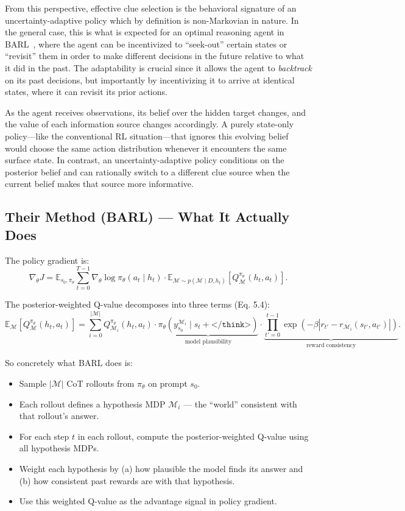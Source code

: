 \documentclass[11pt]{article}
\theoremstyle{plain}
\theoremstyle{definition}
\theoremstyle{remark}
\begin{document}
From this perspective, effective clue selection is the behavioral signature of
an uncertainty-adaptive policy which by definition is non-Markovian in nature. In the general case, this is what is expected for an optimal reasoning agent in BARL~\citep{zhang2025markovianreflectiveexplorationbayesadaptive}, where the agent can be incentivized to “seek-out” certain states or “revisit” them in order to make different decisions in the future relative to what it did in the past. The adaptability is crucial since it allows the agent to \textit{backtrack} on its past decisions, but importantly by incentivizing it to arrive at identical states, where it can revisit its prior actions. 


As the agent receives observations, its belief
over the hidden target changes, and the value of each information source changes
accordingly. A purely state-only policy—like the conventional RL situation—that ignores this evolving belief would
choose the same action distribution whenever it encounters the same surface
state. In contrast, an uncertainty-adaptive policy conditions on the posterior
belief and can rationally switch to a different clue source when the current
belief makes that source more informative.



\subsection{Their Method (BARL) --- What It Actually Does}

The policy gradient is:
\[
\nabla_\theta J
=
\mathbb{E}_{s_0,\pi_\theta}
\sum_{t=0}^{T-1}
\nabla_\theta \log \pi_\theta(a_t \mid h_t)
\cdot
\mathbb{E}_{\mathcal{M}\sim p(\mathcal{M}\mid D,h_t)}
\left[
Q^{\pi_\theta}_{\mathcal{M}}(h_t,a_t)
\right].
\]

The posterior-weighted Q-value decomposes into three terms (Eq. 5.4):
\[
\mathbb{E}_{\mathcal{M}}
\left[
Q^{\pi_\theta}_{\mathcal{M}}(h_t,a_t)
\right]
=
\sum_{i=0}^{|\mathcal{M}|}
Q^{\pi_\theta}_{\mathcal{M}_i}(h_t,a_t)
\cdot
\underbrace{
\pi_\theta
\left(
y^{\mathcal{M}_i}_{s_0}
\mid
s_t + \texttt{</think>}
\right)
}_{\text{model plausibility}}
\cdot
\underbrace{
\prod_{t'=0}^{t-1}
\exp\left(
-\beta
\left|
r_{t'} - r_{\mathcal{M}_i}(s_{t'},a_{t'})
\right|
\right)
}_{\text{reward consistency}}.
\]

So concretely what BARL does is:

\begin{itemize}
    \item Sample $|\mathcal{M}|$ CoT rollouts from $\pi_\theta$ on prompt $s_0$.
    \item Each rollout defines a hypothesis MDP $\mathcal{M}_i$ --- the ``world'' consistent with that rollout's answer.
    \item For each step $t$ in each rollout, compute the posterior-weighted Q-value using all hypothesis MDPs.
    \item Weight each hypothesis by (a) how plausible the model finds its answer and (b) how consistent past rewards are with that hypothesis.
    \item Use this weighted Q-value as the advantage signal in policy gradient.
\end{itemize}
\end{document}
